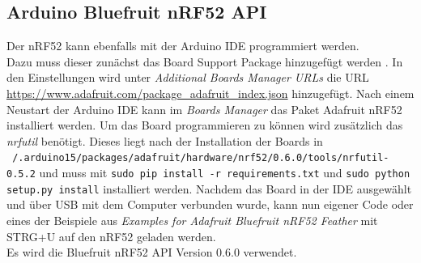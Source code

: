 \subsection{Arduino Bluefruit nRF52 API}
Der nRF52 kann ebenfalls mit der Arduino IDE programmiert werden.\\
Dazu muss dieser zunächst das Board Support Package hinzugefügt werden \cite{townsend2017nrf}.
In den Einstellungen wird unter \textit{Additional Boards Manager URLs} die URL \url{https://www.adafruit.com/package_adafruit_index.json} hinzugefügt.
Nach einem Neustart der Arduino IDE kann im \textit{Boards Manager} das Paket Adafruit nRF52 installiert werden.
Um das Board programmieren zu können wird zusätzlich das \textit{nrfutil} benötigt.
Dieses liegt nach der Installation der Boards in \\\texttt{~/.arduino15/packages/adafruit/hardware/nrf52/0.6.0/tools/nrfutil-0.5.2} und muss mit \texttt{sudo pip install -r requirements.txt} und \texttt{sudo python setup.py install} installiert werden.
Nachdem das Board in der IDE ausgewählt und über USB mit dem Computer verbunden wurde, kann nun eigener Code oder eines der Beispiele aus \textit{Examples for Adafruit Bluefruit nRF52 Feather} mit STRG+U auf den nRF52 geladen werden.\\
Es wird die Bluefruit nRF52 API Version 0.6.0 verwendet.

